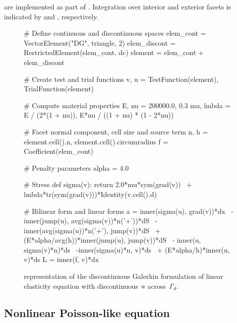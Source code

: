 are implemented as part of \ufl{}. Integration over interior and exterior
facets is indicated by  and , respectively.
%
\begin{figure}
\begin{python}
# Define continuous and discontinuous spaces
elem_cont    = VectorElement("DG", triangle, 2)
elem_discont = RestrictedElement(elem_cont, dc)
element      = elem_cont + elem_discont

# Create test and trial functions
v, u = TestFunction(element), TrialFunction(element)

# Compute material properties
E, nu     = 200000.0, 0.3
mu, lmbda = E / (2*(1 + nu)), E*nu / ((1 + nu) * (1 - 2*nu))

# Facet normal component, cell size and source term
n, h = element.cell().n, element.cell().circumradius
f = Coefficient(elem_cont)

# Penalty parameters
alpha = 4.0

# Stress
def sigma(v):
   return 2.0*mu*sym(grad(v)) \
  + lmbda*tr(sym(grad(v)))*Identity(v.cell().d)

# Bilinear form and linear forms
a = inner(sigma(u), grad(v))*dx \
  - inner(jump(u), avg(sigma(v))*n('+'))*dS \
  - inner(avg(sigma(u))*n('+'), jump(v))*dS \
  + (E*alpha/avg(h))*inner(jump(u), jump(v))*dS \
  - inner(u, sigma(v)*n)*ds \
  -inner(sigma(u)*n, v)*ds \
  + (E*alpha/h)*inner(u, v)*ds
L = inner(f, v)*dx
\end{python}
\caption{{\ufl} representation of the discontinuous Galerkin formulation of
linear elasticity equation with discontinuous $u$ across~$\Gamma_{d}$.}
\label{code:nikbakht:dg-elasticity}
\end{figure}

\subsection{Nonlinear Poisson-like equation}

